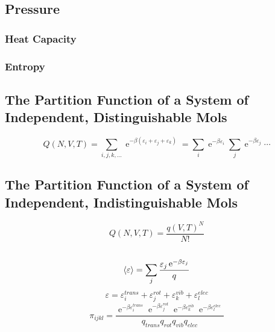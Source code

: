\documentclass[a4paper]{article}
\DeclareMathOperator{\e}{\mathrm{e}}
\numberwithin{equation}{section}
\begin{document}
\subsection{Pressure}

\subsubsection{Heat Capacity}

\subsubsection{Entropy}

\subsection{}

\subsection{The Partition Function of a System of Independent, Distinguishable Mols}
\begin{equation}\label{key}
Q(N,V,T) = \sum_{i,j,k,...} \e^{-\beta(\varepsilon_i +\varepsilon_j + \varepsilon_k)} = \sum_i\e^{-\beta\varepsilon_i} \sum_j\e^{-\beta\varepsilon_j}\cdots
\end{equation}
\subsection{The Partition Function of a System of Independent, Indistinguishable Mols}
\begin{equation}\label{key}
Q(N,V,T) = \dfrac{q(V,T)^N}{N!}
\end{equation}


\subsection{}
\begin{equation}\label{key}
\ev{\varepsilon} = \sum_j \dfrac{\varepsilon_j \e^{-\beta\varepsilon_j}}{q}
\end{equation}
\begin{equation}\label{key}
\varepsilon = \varepsilon_i^{trans} + \varepsilon_j^{rot} + \varepsilon_k^{vib} + \varepsilon_l^{elec}
\end{equation}
\begin{equation}\label{key}
\pi_{ijkl} = \dfrac{\e^{-\beta\varepsilon_i^{trans}}\e^{-\beta\varepsilon_j^{rot}} \e^{-\beta\varepsilon_k^{vib}}\e^{-\beta\varepsilon_l^{elec}}}{q_{trans}q_{rot}q_{vib}q_{elec}}
\end{equation}
\end{document}
